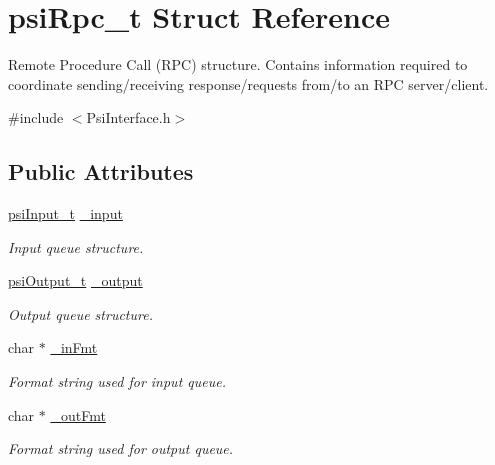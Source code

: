 \hypertarget{structpsiRpc__t}{}\section{psi\+Rpc\+\_\+t Struct Reference}
\label{structpsiRpc__t}


Remote Procedure Call (R\+PC) structure. Contains information required to coordinate sending/receiving response/requests from/to an R\+PC server/client.  




{\ttfamily \#include $<$Psi\+Interface.\+h$>$}

\subsection*{Public Attributes}
\begin{DoxyCompactItemize}
\item 
\mbox{\label{structpsiRpc__t_a957a8bcaac05ec113b43b6ba77915ec3}} 
\hyperlink{structpsiInput__t}{psi\+Input\+\_\+t} \hyperlink{structpsiRpc__t_a957a8bcaac05ec113b43b6ba77915ec3}{\+\_\+input}
\begin{DoxyCompactList}\small\item\em Input queue structure. \end{DoxyCompactList}\item 
\mbox{\label{structpsiRpc__t_a17f0094559da23188f3782d9cca1157a}} 
\hyperlink{structpsiOutput__t}{psi\+Output\+\_\+t} \hyperlink{structpsiRpc__t_a17f0094559da23188f3782d9cca1157a}{\+\_\+output}
\begin{DoxyCompactList}\small\item\em Output queue structure. \end{DoxyCompactList}\item 
\mbox{\label{structpsiRpc__t_a31c6a55cda7c12d643fbe358e429c207}} 
char $\ast$ \hyperlink{structpsiRpc__t_a31c6a55cda7c12d643fbe358e429c207}{\+\_\+in\+Fmt}
\begin{DoxyCompactList}\small\item\em Format string used for input queue. \end{DoxyCompactList}\item 
\mbox{\label{structpsiRpc__t_a5f04717309ffe83b639b459d5052ea19}} 
char $\ast$ \hyperlink{structpsiRpc__t_a5f04717309ffe83b639b459d5052ea19}{\+\_\+out\+Fmt}
\begin{DoxyCompactList}\small\item\em Format string used for output queue. \end{DoxyCompactList}\end{DoxyCompactItemize}


